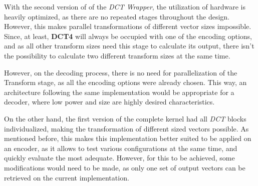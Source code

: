 With the second version of of the \emph{DCT Wrapper}, the utilization of hardware is heavily optimized, as there are no repeated stages throughout the design. However, this makes  parallel transformations of different vector sizes impossible. Since, at least, \textbf{DCT4} will always be occupied with one of the encoding options, and as all other transform sizes need this stage to calculate its output, there isn't the possibility to calculate two different transform sizes at the same time.

However, on the decoding process, there is no need for parallelization of the Transform stage, as all the encoding options were already chosen. This way, an architecture following the same implementation would be appropriate for a decoder, where low power and size are highly desired characteristics.

On the other hand, the first version of the complete kernel had all \emph{DCT} blocks individualized, making the transformation of different sized vectors possible. As mentioned before, this makes this implementation better suited to be applied on an encoder, as it allows to test various configurations at the same time, and quickly evaluate the most adequate. However, for this to be achieved, some modifications would need to be made, as only one set of output vectors can be retrieved on the current implementation.


\clearpage
\printbibliography[heading=subbibliography]
